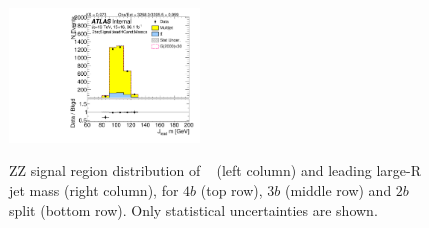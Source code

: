 \begin{figure}[htbp!]
\begin{center}
\includegraphics[width=0.45\textwidth,angle=-90]{figures/boosted/ZZ/Moriond_ZZ_TwoTag_split_Signal_leadHCand_Mass_s.pdf}\\
\end{center}
\caption{ZZ signal region distribution of \mtwoJ~ (left column) and leading large-R jet mass (right column), for $4b$ (top row), $3b$ (middle row) and $2b$ split (bottom row). Only statistical uncertainties are shown.}
\label{CRSB:ZZSR_Distribution}
\end{figure}

% 

% 

% 


